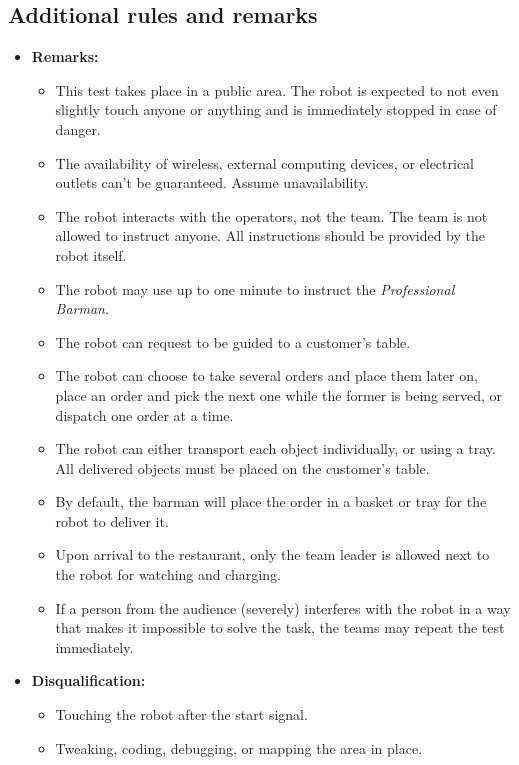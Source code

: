 \subsection*{Additional rules and remarks}
\begin{itemize}
	\item \textbf{Remarks:}
	\begin{itemize}
		\item This test takes place in a public area. The robot is expected to not even slightly touch anyone or anything and is immediately stopped in case of danger.
		\item The availability of wireless, external computing devices, or electrical outlets can't be guaranteed. Assume unavailability.
		\item The robot interacts with the operators, not the team. The team is not allowed to instruct anyone. All instructions should be provided by the robot itself.
		\item The robot may use up to one minute to instruct the \textit{Professional Barman}.
		\item The robot can request to be guided to a customer's table.
		\item The robot can choose to take several orders and place them later on, place an order and pick the next one while the former is being served, or dispatch one order at a time.
		\item The robot can either transport each object individually, or using a tray. All delivered objects must be placed on the customer's table.
		\item By default, the barman will place the order in a basket or tray for the robot to deliver it.
		\item Upon arrival to the restaurant, only the team leader is allowed next to the robot for watching and charging.
		\item If a person from the audience (severely) interferes with the robot in a way that makes it impossible to solve the task, the teams may repeat the test immediately.
	\end{itemize}
	\item \textbf{Disqualification:}
	\begin{itemize}
		\item Touching the robot after the start signal.
		\item Tweaking, coding, debugging, or mapping the area in place.
	\end{itemize}
\end{itemize}

